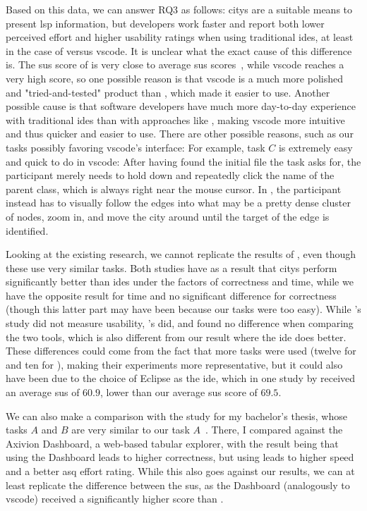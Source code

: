 \documentclass[../thesis]{subfiles}
\begin{document}
Based on this data, we can answer \textsf{RQ3} as follows:
\Glspl{city} are a suitable means to present \gls{lsp} information, but developers work faster and report both lower perceived effort and higher usability ratings when using traditional \glspl{ide}, at least in the case of \SEE{} versus \gls{vscode}.
It is unclear what the exact cause of this difference is.
The \gls{sus} score of \SEE{} is very close to average \gls{sus} scores~\cite{sauro2013}, while \gls{vscode} reaches a very high score, so one possible reason is that \gls{vscode} is a much more polished and "tried-and-tested" product than \SEE{}, which made it easier to use.
Another possible cause is that software developers have much more day-to-day experience with traditional \glspl{ide} than with approaches like \SEE{}, making \gls{vscode} more intuitive and thus quicker and easier to use.
There are other possible reasons, such as our tasks possibly favoring \gls{vscode}'s interface:
For example, task $C$ is extremely easy and quick to do in \gls{vscode}:
After having found the initial file the task asks for, the participant merely needs to hold down  and repeatedly click the name of the parent class, which is always right near the mouse cursor.
In \SEE{}, the participant instead has to visually follow the edges into what may be a pretty dense cluster of nodes, zoom in, and move the city around until the target of the edge is identified.

Looking at the existing research, we cannot replicate the results of \textcite{wettel2011,romano2019}, even though these use very similar tasks.
Both studies have as a result that \glspl{city} perform significantly better than \glspl{ide} under the factors of correctness and time, while we have the opposite result for time and no significant difference for correctness (though this latter part may have been because our tasks were too easy).
While \citeauthor{wettel2011}'s study did not measure usability, \citeauthor{romano2019}'s did, and found no difference when comparing the two tools, which is also different from our result where the \gls{ide} does better.
These differences could come from the fact that more tasks were used (twelve for \citeauthor{wettel2011} and ten for \citeauthor{romano2019}), making their experiments more representative, but it could also have been due to the choice of Eclipse as the \gls{ide}, which in one study by \textcite{morales2019} received an average \gls{sus} of $60.9$, lower than our average \SEE{} \gls{sus} score of $69.5$.

We can also make a comparison with the study for my bachelor's thesis, whose tasks $A$ and $B$ are very similar to our task $A$~\cite{galperin2022}.
There, I compared \SEE{} against the Axivion Dashboard, a web-based tabular  explorer, with the result being that using the Dashboard leads to higher correctness, but using \SEE{} leads to higher speed and a better \gls{asq} effort rating.
While this also goes against our results, we can at least replicate the difference between the \gls{sus}, as the Dashboard (analogously to \gls{vscode}) received a significantly higher score than \SEE{}.
\end{document}
